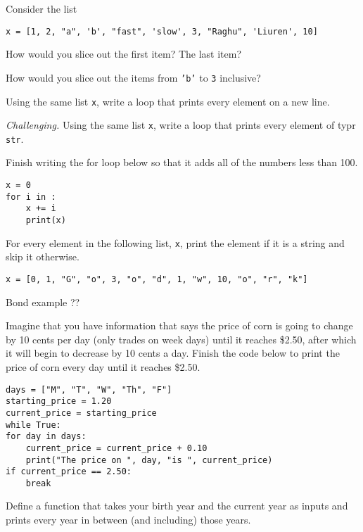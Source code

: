 \documentclass[11pt]{exam}
\begin{document}
\begin{questions}
\item Consider the list 
\begin{verbatim}
x = [1, 2, "a", 'b', "fast", 'slow', 3, "Raghu", 'Liuren', 10]
\end{verbatim}
\begin{parts}
\item How would you slice out the first item?  The last item?  
\item How would you slice out the items from {\tt 'b'} to {\tt 3} inclusive?  
\end{parts} 

\item Using the same list {\tt x}, write a loop that prints every element on a new line. 

\item {\it Challenging.\/} 
Using the same list {\tt x}, write a loop that prints every element of typr {\tt str}.

\item Finish writing the for loop below so that it adds all of the numbers less than 100.
\begin{verbatim}
x = 0
for i in :
    x += i
    print(x)
\end{verbatim}

\item For every element in the following list, \texttt{x}, print the element if it is a string and skip it otherwise.
\begin{verbatim}
x = [0, 1, "G", "o", 3, "o", "d", 1, "w", 10, "o", "r", "k"]
\end{verbatim}

\item Bond example ??

\item Imagine that you have information that says the price of corn is going to change by 10 cents per day (only trades on week days) until it reaches \$2.50, after which it will begin to decrease by 10 cents a day. Finish the code below to print the price of corn every day until it reaches \$2.50.
\begin{verbatim}
days = ["M", "T", "W", "Th", "F"]
starting_price = 1.20
current_price = starting_price
while True:
for day in days:
    current_price = current_price + 0.10
    print("The price on ", day, "is ", current_price)
if current_price == 2.50:
    break
\end{verbatim}

\item Define a function that takes your birth year and the current year as inputs 
and prints every year in between (and including) those years.


\end{questions}
\end{document}
